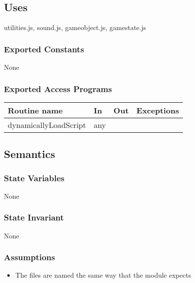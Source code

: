 \documentclass[12pt]{article}
\begin{document}
\subsection*{Uses}

utilities.js, sound.js, gameobject.js, gamestate.js\\

\subsubsection*{Exported Constants}

None

\subsubsection*{Exported Access Programs}

\begin{tabular}{| l | l | l | l |}
    \hline
    \textbf{Routine name} & \textbf{In} & \textbf{Out} & \textbf{Exceptions}\\
    \hline
    dynamicallyLoadScript & any & ~ & ~\\
    \hline

\end{tabular}

\subsection* {Semantics}

\subsubsection* {State Variables}

None

\subsubsection* {State Invariant}

None

\subsubsection* {Assumptions}

\begin{itemize}
    \item The files are named the same way that the module expects
\end{itemize}
\end{document}
